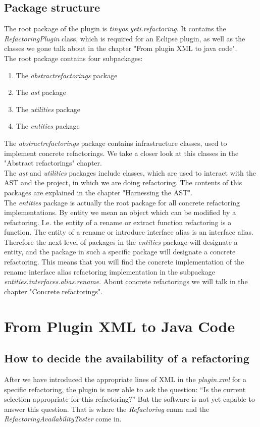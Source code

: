 \documentclass[a4paper,10pt]{report}
\begin{document}
\section{Package structure}
The root package of the plugin is {\it tinyos.yeti.refactoring}. It contains the {\it RefactoringPlugin} class, which is required for an Eclipse plugin, as well as the classes we gone talk about in the chapter "From plugin XML to java code".\\
The root package contains four subpackages:
   \begin{enumerate}
     \item The {\it abstractrefactorings} package
     \item The {\it ast} package
     \item The {\it utilities} package
     \item The {\it entities} package
   \end{enumerate}
The {\it abstractrefactorings} package contains infrastructure classes, used to implement concrete refactorings. We take a closer look at this classes in the "Abstract refactorings" chapter.\\
The {\it ast} and {\it utilities} packages include classes, which are used to interact with the AST and the project, in which we are doing refactoring. The contents of this packages are explained in the chapter "Harnessing the AST".\\
The {\it entities} package is actually the root package for all concrete refactoring implementations. By entity we mean an object which can be modified by a refactoring. I.e. the entity of a rename or extract function refactoring is a function. The entity of a rename or introduce interface alias is an interface alias.
Therefore the next level of packages in the {\it entities} package will designate a entity, and the package in such a specific package will designate a concrete refactoring. This means that you will find the concrete implementation of the rename interface alias refactoring implementation in the subpackage {\it entities.interfaces.alias.rename}.
About concrete refactorings we will talk in the chapter "Concrete refactorings".


\chapter{From Plugin XML to Java Code}
\section{How to decide the availability of a refactoring}
After we have introduced the appropriate lines of XML in the {\it plugin.xml} for a specific refactoring, the plugin is now able to ask the question: ``Is the current selection appropriate for this refactoring?''
But the software is not yet capable to answer this question. That is where the {\it Refactoring} enum and the {\it RefactoringAvailabilityTester} come in.
\end{document}
